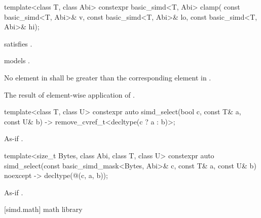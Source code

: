 \begin{itemdecl}
template<class T, class Abi>
  constexpr basic_simd<T, Abi> clamp(
    const basic_simd<T, Abi>& v, const basic_simd<T, Abi>& lo, const basic_simd<T, Abi>& hi);
\end{itemdecl}

\begin{itemdescr}
  \pnum\constraints
   satisfies .

  \pnum\expects
   models .

  \pnum\expects
  No element in  shall be greater than the corresponding element in .

  \pnum\returns
  The result of element-wise application of  \foralli.
\end{itemdescr}

\begin{itemdecl}
  template<class T, class U>
    constexpr auto simd_select(bool c, const T& a, const U& b)
    -> remove_cvref_t<decltype(c ? a : b)>;
\end{itemdecl}

\begin{itemdescr}
    \pnum\returns As-if .
\end{itemdescr}

\begin{itemdecl}
  template<size_t Bytes, class Abi, class T, class U>
    constexpr auto simd_select(const basic_simd_mask<Bytes, Abi>& c, const T& a, const U& b)
    noexcept -> decltype(@\simdselect@(c, a, b));
\end{itemdecl}

\begin{itemdescr}
    \pnum\returns As-if .
\end{itemdescr}

[simd.math]{ math library}

